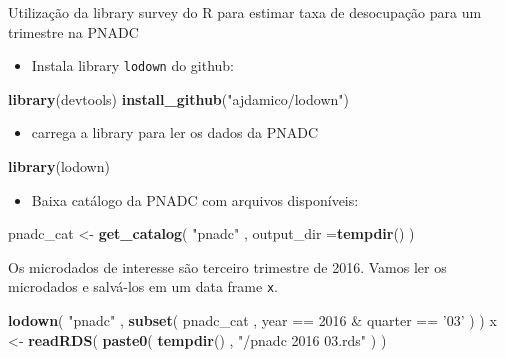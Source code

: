 \documentclass[]{book}
\newenvironment{Shaded}{\begin{snugshade}}{\end{snugshade}}
\newcommand{\KeywordTok}[1]{\textcolor[rgb]{0.13,0.29,0.53}{\textbf{{#1}}}}
\newcommand{\DataTypeTok}[1]{\textcolor[rgb]{0.13,0.29,0.53}{{#1}}}
\newcommand{\DecValTok}[1]{\textcolor[rgb]{0.00,0.00,0.81}{{#1}}}
\newcommand{\StringTok}[1]{\textcolor[rgb]{0.31,0.60,0.02}{{#1}}}
\newcommand{\NormalTok}[1]{{#1}}
\providecommand{\tightlist}{%
  \setlength{\itemsep}{0pt}\setlength{\parskip}{0pt}}
\numberwithin{example}{chapter}
\numberwithin{remark}{chapter}
\numberwithin{definition}{chapter}
\let\BeginKnitrBlock\begin \let\EndKnitrBlock\end
\begin{document}
\BeginKnitrBlock{example}
\protect\hypertarget{ex:unnamed-chunk-14}{}{\label{ex:unnamed-chunk-14}}Utilização
da library survey do R para estimar taxa de desocupação para um
trimestre na PNADC
\EndKnitrBlock{example}

\begin{itemize}
\tightlist
\item
  Instala library \texttt{lodown} \citep{R-lodown} do github:
\end{itemize}

\begin{Shaded}
\begin{Highlighting}[]
\KeywordTok{library}\NormalTok{(devtools)}
\KeywordTok{install_github}\NormalTok{(}\StringTok{"ajdamico/lodown"}\NormalTok{)}
\end{Highlighting}
\end{Shaded}

\begin{itemize}
\tightlist
\item
  carrega a library para ler os dados da PNADC
\end{itemize}

\begin{Shaded}
\begin{Highlighting}[]
\KeywordTok{library}\NormalTok{(lodown)}
\end{Highlighting}
\end{Shaded}

\begin{itemize}
\tightlist
\item
  Baixa catálogo da PNADC com arquivos disponíveis:
\end{itemize}

\begin{Shaded}
\begin{Highlighting}[]
\NormalTok{pnadc_cat <-}\StringTok{ }\KeywordTok{get_catalog}\NormalTok{( }\StringTok{"pnadc"} \NormalTok{, }\DataTypeTok{output_dir =}\KeywordTok{tempdir}\NormalTok{() )}
\end{Highlighting}
\end{Shaded}

Os microdados de interesse são terceiro trimestre de 2016. Vamos ler os
microdados e salvá-los em um data frame \texttt{x}.

\begin{Shaded}
\begin{Highlighting}[]
\KeywordTok{lodown}\NormalTok{( }\StringTok{"pnadc"} \NormalTok{, }\KeywordTok{subset}\NormalTok{( pnadc_cat , year ==}\StringTok{ }\DecValTok{2016} \NormalTok{&}\StringTok{ }\NormalTok{quarter ==}\StringTok{ '03'} \NormalTok{) )}
\NormalTok{x <-}\StringTok{ }\KeywordTok{readRDS}\NormalTok{( }\KeywordTok{paste0}\NormalTok{( }\KeywordTok{tempdir}\NormalTok{() , }\StringTok{"/pnadc 2016 03.rds"} \NormalTok{) )}
\end{Highlighting}
\end{Shaded}
\end{document}

